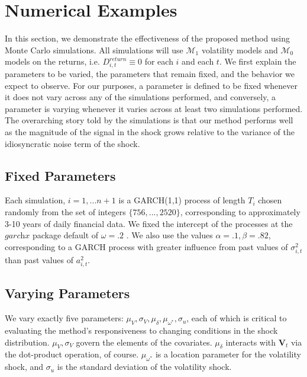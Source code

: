 \documentclass[11pt,3p,review,authoryear]{elsarticle}
\def\mc#1{\mathcal{#1}} %
\def\mc#1{\mathcal{#1}}
\theoremstyle{definition}
\begin{document}
\section{Numerical Examples}

In this section, we demonstrate the effectiveness of the proposed method using Monte Carlo simulations.  All simulations will use $\mc{M}_1$ volatility models and $\mc{M}_0$ models on the returns, i.e. $  D^{return}_{i,t} \equiv 0$ for each $i$ and each $t$.  We first explain the parameters to be varied, the parameters that remain fixed, and the behavior we expect to observe.  For our purposes, a parameter is defined to be fixed whenever it does not vary across any of the simulations performed, and conversely, a parameter is varying whenever it varies across at least two simulations performed. The overarching story told by the simulations is that our method performs well as the magnitude of the signal in the shock grows relative to the variance of the idiosyncratic noise term of the shock. 

  \subsection{Fixed Parameters}
Each simulation, $i=1,...n+1$ is a GARCH(1,1) process of length $T_{i}$ chosen randomly from the set of integers $\{756,...,2520\}$, corresponding to approximately 3-10 years of daily financial data.  We fixed the intercept of the processes at the $\textit{garchx}$ package default of $\omega = .2$ \citep{RePEc:pra:mprapa:100301}.  We also use the values $\alpha=.1, \beta = .82$, corresponding to a GARCH process with greater influence from past values of $\sigma^{2}_{i,t}$ than past values of $a^{2}_{i,t}$.


  \subsection{Varying Parameters}
  We vary exactly five parameters: $\mu_{V}, \sigma_{V}, \mu_{\delta}, \mu_{\omega^{*}}, \sigma_{u}$, each of which is critical to evaluating the method's responsiveness to changing conditions in the shock distribution. $\mu_{V}, \sigma_{V}$ govern the elements of the covariates. $\mu_{\delta}$ interacts with $\textbf{V}_{t}$ via the dot-product operation, of course.  $\mu_{\omega^{*}}$ is a location parameter for the volatility shock, and $\sigma_{u}$ is the standard deviation of the volatility shock.
  
\end{document}
